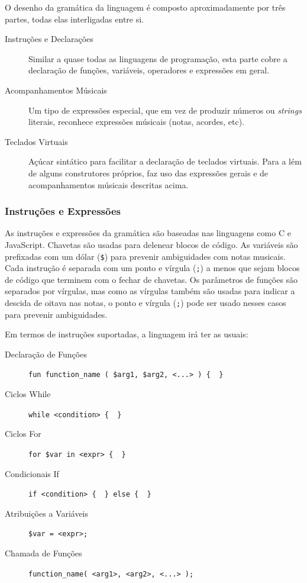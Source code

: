 \documentclass[
  oneside,
  11pt, a4paper,
  footinclude=true,
  headinclude=true,
  cleardoublepage=empty
]{scrbook}
\begin{document}
	O desenho da gramática da linguagem é composto aproximadamente por três partes, todas elas interligadas entre si.
	\begin{description}
	 \item[Instruções e Declarações] Similar a quase todas as linguagens de programação, esta parte cobre a declaração de funções, variáveis, operadores e expressões em geral.
	 \item[Acompanhamentos Músicais] Um tipo de expressões especial, que em vez de produzir números ou \textit{strings} literais, reconhece expressões músicais (notas, acordes, etc).
	 \item[Teclados Virtuais] Açúcar sintático para facilitar a declaração de teclados virtuais. Para a lém de alguns construtores próprios, faz uso das expressões gerais e de acompanhamentos músicais descritas acima.
	\end{description}

	\subsubsection{Instruções e Expressões}
	As instruções e expressões da gramática são baseadas nas linguagens como C e JavaScript. Chavetas são usadas para delenear blocos de código. As variáveis são prefixadas com um dólar (\texttt{\$}) para prevenir ambiguidades com notas musicais. Cada instrução é separada com um ponto e vírgula (\texttt{;}) a menos que sejam blocos de código que terminem com o fechar de chavetas. Os parâmetros de funções são separados por vírgulas, mas como as vírgulas também são usadas para indicar a descida de oitava nas notas, o ponto e vírgula (\texttt{;}) pode ser usado nesses casos para prevenir ambiguidades.
	
	Em termos de instruções suportadas, a linguagem irá ter as usuais:
    \begin{description}
     \item[Declaração de Funções] \verb|fun function_name ( $arg1, $arg2, <...> ) {  }|
     \item[Ciclos While] \verb|while <condition> {  }|
     \item[Ciclos For] \verb|for $var in <expr> {  }|
     \item[Condicionais If] \verb|if <condition> {  } else {  }|
     \item[Atribuições a Variáveis] \verb|$var = <expr>;|
     \item[Chamada de Funções] \verb|function_name( <arg1>, <arg2>, <...> );|
    \end{description}
    
\end{document}

